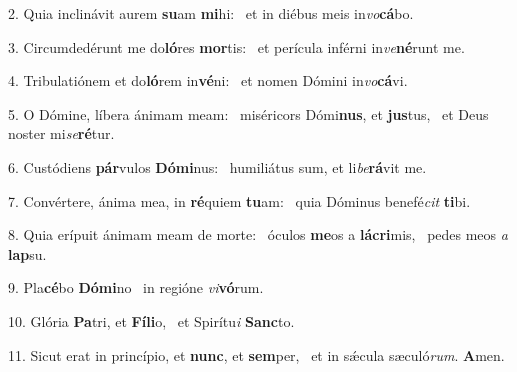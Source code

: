 2. Quia inclinávit aurem \textbf{su}am \textbf{mi}hi: \ast\  et in diébus meis in\textit{vo}\textbf{cá}bo.\

3. Circumdedérunt me do\textbf{ló}res \textbf{mor}tis: \ast\  et perícula inférni in\textit{ve}\textbf{né}runt me.\

4. Tribulatiónem et do\textbf{ló}rem in\textbf{vé}ni: \ast\  et nomen Dómini in\textit{vo}\textbf{cá}vi.\

5. O Dómine, líbera ánimam meam: \dag\  miséricors Dómi\textbf{nus}, et \textbf{jus}tus, \ast\  et Deus noster mi\textit{se}\textbf{ré}tur.\

6. Custódiens \textbf{pár}vulos \textbf{Dó}\textbf{mi}nus: \ast\  humiliátus sum, et li\textit{be}\textbf{rá}vit me.\

7. Convértere, ánima mea, in \textbf{ré}quiem \textbf{tu}am: \ast\  quia Dóminus benefé\textit{cit} \textbf{ti}bi.\

8. Quia erípuit ánimam meam de morte: \dag\  óculos \textbf{me}os a \textbf{lá}\textbf{cri}mis, \ast\  pedes meos \textit{a} \textbf{lap}su.\

9. Pla\textbf{cé}bo \textbf{Dó}\textbf{mi}no \ast\  in regióne \textit{vi}\textbf{vó}rum.\

10. Glória \textbf{Pa}tri, et \textbf{Fí}\textbf{li}o, \ast\  et Spirítu\textit{i} \textbf{Sanc}to.\

11. Sicut erat in princípio, et \textbf{nunc}, et \textbf{sem}per, \ast\  et in sǽcula sæculó\textit{rum}. \textbf{A}men.\

